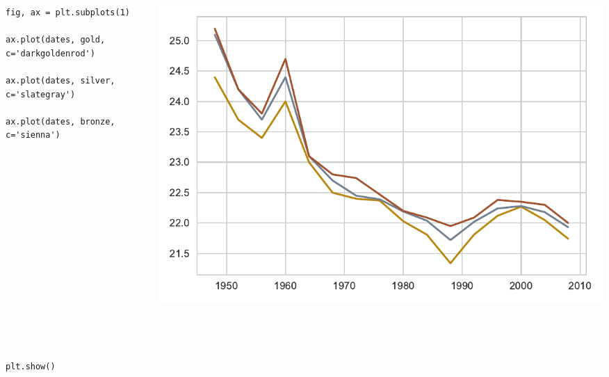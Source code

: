 \documentclass{beamer}
\begin{document}
\begin{frame}[fragile]
\tiny{
\begin{columns}
\begin{column}{0.45\textwidth}
\begin{verbatim}
fig, ax = plt.subplots(1)

ax.plot(dates, gold, c='darkgoldenrod')

ax.plot(dates, silver, c='slategray')

ax.plot(dates, bronze, c='sienna')
















plt.show()
\end{verbatim}
\end{column}
\begin{column}{0.55\textwidth}
\includegraphics[width=\textwidth]{../olympics_2.pdf}
\end{column}
\end{columns}
}
\end{frame}
\end{document}
